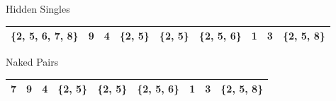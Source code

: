 \documentclass{beamer}
\begin{document}
\begin{frame}{Hidden Singles}

\begin{table}[htbp]

    \begin{center}
        \begin{tabular}{|c|c|c|c|c|c|c|c|c|}
        \hline
        \cellcolor[gray]{0.7}\{2, 5, 6, 7, 8\} & 9 & 4 & \{2, 5\} & \{2, 5\} & \{2, 5, 6\} & 1 & 3 & \{2, 5, 8\}\\
        \hline
        \end{tabular}
    \end{center}
\end{table}

\end{frame}

\begin{frame}{Naked Pairs}

\begin{table}[htbp]

    \begin{center}

        \begin{tabular}{|c|c|c|c|c|c|c|c|c|}
        \hline
        7 & 9 & 4 & \cellcolor[gray]{0.7}\{2, 5\} & \cellcolor[gray]{0.7}\{2, 5\} & \{2, 5, 6\} & 1 & 3 & \{2, 5, 8\}\\
        \hline
        \end{tabular}
    \end{center}
\end{table}
\end{frame}
\end{document}
